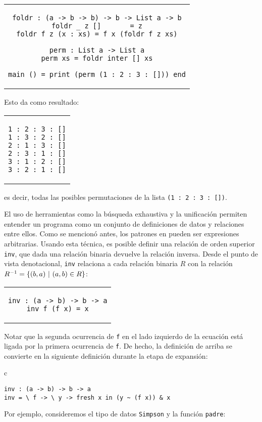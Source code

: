 \begin{center}
\begin{tabular}{c}
\begin{lstlisting}[mathescape=true]
foldr : (a -> b -> b) -> b -> List a -> b
foldr _ z []       = z
foldr f z (x : xs) = f x (foldr f z xs)

perm : List a -> List a
perm xs = foldr inter [] xs

main () = print (perm (1 : 2 : 3 : [])) end
\end{lstlisting}
\end{tabular}
\end{center}
Esto da como resultado:
\begin{center}
\begin{tabular}{c}
\begin{lstlisting}[mathescape=true]
1 : 2 : 3 : []
1 : 3 : 2 : []
2 : 1 : 3 : []
2 : 3 : 1 : []
3 : 1 : 2 : []
3 : 2 : 1 : []
\end{lstlisting}
\end{tabular}
\end{center}
es decir, todas las posibles permutaciones de la lista \verb|(1 : 2 : 3 : [])|.
\bigskip

El uso de herramientas como
la búsqueda exhaustiva y la unificación permiten entender 
un programa como un conjunto de definiciones de datos y relaciones entre ellos.
Como se mencionó antes, los patrones en \nuflo pueden ser expresiones arbitrarias.
Usando esta técnica, es posible definir una relación de orden superior
\verb|inv|, que dada una relación binaria devuelve la relación inversa.
Desde el punto de vista denotacional,
\verb|inv| relaciona a cada relación binaria $R$
con la relación $R^{-1} = \{(b,a) \ |\  (a,b) \in R\}$:
\begin{center}
\begin{tabular}{c}
\begin{lstlisting}[mathescape=true]
inv : (a -> b) -> b -> a
inv f (f x) = x
\end{lstlisting}
\end{tabular}
\end{center}
Notar que la segunda ocurrencia de \verb|f| en el lado izquierdo de la ecuación
está ligada por la primera ocurrencia de \verb|f|.
De hecho, la definición de arriba se convierte en la siguiente definición
durante la etapa de expansión:
\begin{center}
\begin{tabular}{c}
\begin{lstlisting}[mathescape=true]
inv : (a -> b) -> b -> a
inv = \ f -> \ y -> fresh x in (y ~ (f x)) & x
\end{lstlisting}
\end{tabular}
\end{center}
Por ejemplo, consideremos el tipo de datos \verb|Simpson|
y la función \verb|padre|:

